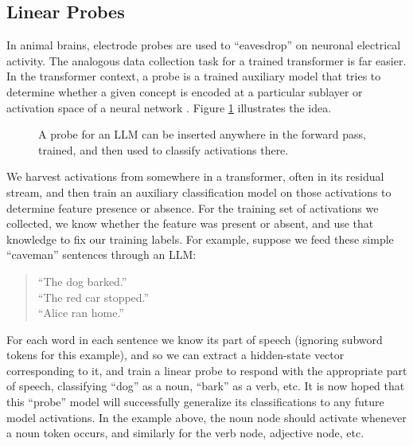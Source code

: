 
\subsection{Linear Probes}\label{linearProbes}

In animal brains, electrode probes are used to ``eavesdrop'' on neuronal
electrical activity. The analogous data collection task for a trained
transformer is far easier. In the transformer context, a probe is a trained
auxiliary model that tries to determine whether a given concept is encoded at a
particular sublayer or activation space of a neural network
\cite{alain2018intermediate, belinkov2021classifiers}. Figure \ref{linearProbe}
illustrates the idea.

\begin{figure}[ht]
\centering
{}
\caption[Jeff Yoshimi; the line art for the probe was generated by ChatGPT.]{ A
      probe for an LLM can be inserted anywhere in the forward pass, trained,
      and then used to classify activations there.}
\label{linearProbe}
\end{figure}

We harvest activations from somewhere in a transformer, often in
its residual stream, and then train an auxiliary classification model on those
activations to determine feature presence or absence. For the training set of
activations we collected, we know whether the feature was present or
absent, and use that knowledge to fix our training labels. For example, suppose we feed these simple ``caveman'' sentences through an LLM:
\begin{quote}
``The dog barked.''\\
``The red car stopped.''\\
``Alice ran home.''
\end{quote}
For each word in each sentence we know its part of speech (ignoring subword tokens for this example), and so we can extract a hidden-state vector corresponding to it, and train a linear probe to respond with the appropriate part of speech, classifying ``dog'' as a noun, ``bark'' as a verb, etc.  It is now hoped that this ``probe'' model will successfully generalize its
classifications to any future model activations.  In the example above, the noun node should activate whenever a noun token occurs, and similarly for the verb node, adjective node, etc.


